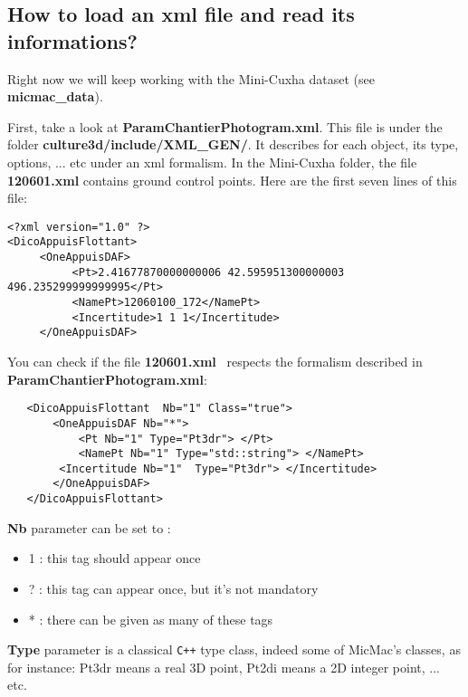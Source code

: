 \documentclass[a4paper]{book}
\begin{document}
\subsection{How to load an xml file and read its informations?}
Right now we will keep working with the Mini-Cuxha dataset (see \textbf{micmac\_data}). \newline

First, take a look at \og \textbf{ParamChantierPhotogram.xml}\fg. \newline
This file is under the folder \og\textbf{culture3d/include/XML\_GEN/}\fg. It describes for each object, its type, options, ... etc under an xml formalism. In the Mini-Cuxha folder, the file \textbf{120601.xml} contains ground control points. Here are the first seven lines of this file:
\begin{lstlisting}
<?xml version="1.0" ?>
<DicoAppuisFlottant>
     <OneAppuisDAF>
          <Pt>2.41677870000000006 42.595951300000003 496.235299999999995</Pt>
          <NamePt>12060100_172</NamePt>
          <Incertitude>1 1 1</Incertitude>
     </OneAppuisDAF>
\end{lstlisting}

You can check if the file \og \textbf{120601.xml} \fg\ respects the formalism described in \textbf{ParamChantierPhotogram.xml}:\newline
\begin{lstlisting}
   <DicoAppuisFlottant  Nb="1" Class="true">
       <OneAppuisDAF Nb="*">
           <Pt Nb="1" Type="Pt3dr"> </Pt>
           <NamePt Nb="1" Type="std::string"> </NamePt>
        <Incertitude Nb="1"  Type="Pt3dr"> </Incertitude>
       </OneAppuisDAF>
   </DicoAppuisFlottant>
\end{lstlisting}

\textbf{Nb} parameter can be set to :
\begin{itemize}
\item 1 : this tag should appear once
\item ? : this tag can appear once, but it's not mandatory
\item * : there can be given as many of these tags \newline
\end{itemize}

\textbf{Type} parameter is a classical \verb!C++! type class, indeed some of MicMac's classes, as for instance: Pt3dr means a real 3D point, Pt2di means a 2D integer point, ... etc. \newline
\end{document}
